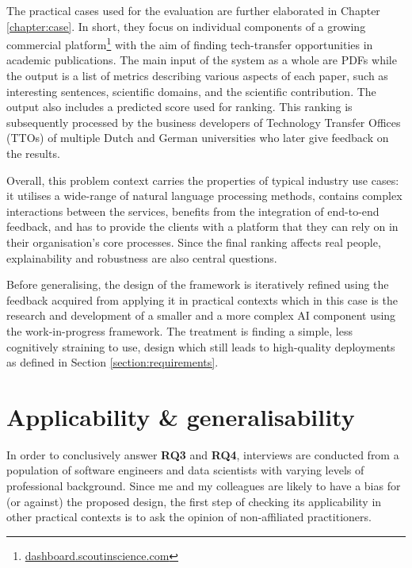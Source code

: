 The practical cases used for the evaluation are further elaborated in Chapter \ref{chapter:case}. In short, they focus on individual components of a growing commercial platform\footnote{\href{https://dashboard.scoutinscience.com/}{dashboard.scoutinscience.com}} with the aim of finding tech-transfer opportunities in academic publications. The main input of the system as a whole are PDFs while the output is a list of metrics describing various aspects of each paper, such as interesting sentences, scientific domains, and the scientific contribution. The output also includes a predicted score used for ranking. This ranking is subsequently processed by the business developers of Technology Transfer Offices (TTOs) of multiple Dutch and German universities who later give feedback on the results.

Overall, this problem context carries the properties of typical industry use cases: it utilises a wide-range of natural language processing methods, contains complex interactions between the services, benefits from the integration of end-to-end feedback, and has to provide the clients with a platform that they can rely on in their organisation's core processes. Since the final ranking affects real people, explainability and robustness are also central questions.

Before generalising, the design of the framework is iteratively refined using the feedback acquired from applying it in practical contexts which in this case is the research and development of a smaller and a more complex AI component using the work-in-progress framework. The treatment is finding a simple, less cognitively straining to use, design which still leads to high-quality deployments as defined in Section \ref{section:requirements}.

\section{Applicability \& generalisability} \label{section:interview-setup}

In order to conclusively answer \textbf{RQ3} and \textbf{RQ4}, interviews are conducted from a population of software engineers and data scientists with varying levels of professional background. Since me and my colleagues are likely to have a bias for (or against) the proposed design, the first step of checking its applicability in other practical contexts is to ask the opinion of non-affiliated practitioners.

